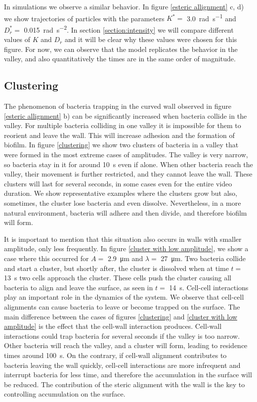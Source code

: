 In simulations we observe a similar behavior. In figure \ref{esteric allignment} c, d) we show trajectories of particles with the parameters $K^*=$ \SI[per-mode = symbol]{3.0}{\radian \per \second} and $D_r^*= $ \SI[per-mode = symbol]{0.015}{\radian \per \square\second}. In section \ref{section:intensity} we will compare different values of $K$ and $D_r$ and it will be clear why these values were chosen for this figure. For now, we can observe that the model replicates the behavior in the valley, and also quantitatively the times are in the same order of magnitude. 


\label{section: clustering} 
\subsection{Clustering}

The phenomenon of bacteria trapping in the curved wall observed in figure \ref{esteric allignment} b) can be significantly increased when bacteria collide in the valley. For multiple bacteria colliding in one valley it is impossible for them to reorient and leave the wall. This will increase adhesion and the formation of biofilm. In figure \ref{clustering} we show two clusters of bacteria in a valley that were formed in the most extreme cases of amplitudes. The valley is very narrow, so bacteria stay in it for around \SI{10}{\second} even if alone. When other bacteria reach the valley, their movement is further restricted, and they cannot leave the wall. These clusters will last for several seconds, in some cases even for the entire video duration. We show representative examples where the clusters grow but also, sometimes, the cluster lose bacteria and even dissolve. Nevertheless, in a more natural environment, bacteria will adhere and then divide, and therefore biofilm will form. 

It is important to mention that this situation also occurs in walls with smaller amplitude, only less frequently. In figure \ref{cluster with low amplitude}, we show a case where this occurred for $A=$ \SI{2.9}{\micro\meter} and $\lambda=$ \SI{27}{\micro\meter}. Two bacteria collide and start a cluster, but shortly after, the cluster is dissolved when at time $t= $ \SI{13}{\second} two cells approach the cluster. These cells push the cluster causing all bacteria to align and leave the surface, as seen in  $t= $ \SI{14}{\second}. Cell-cell interactions play an important role in the dynamics of the system. We observe that cell-cell alignments can cause bacteria to leave or become trapped on the surface. The main difference between the cases of figures \ref{clustering} and \ref{cluster with low amplitude} is the effect that the cell-wall interaction produces. Cell-wall interactions could trap bacteria for several seconds if the valley is too narrow. Other bacteria will reach the valley, and a cluster will form, leading to residence times around \SI{100}{\second}. On the contrary, if cell-wall alignment contributes to bacteria leaving the wall quickly, cell-cell interactions are more infrequent and interrupt bacteria for less time, and therefore the accumulation in the surface will be reduced. The contribution of the steric alignment with the wall is the key to controlling accumulation on the surface.

